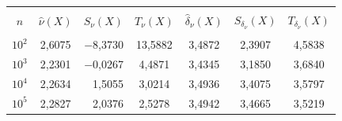 \begin{table}\small %


\begin{center}




\vspace*{2ex}





\tabcolsep=11.5pt


\begin{tabular}{|c|c|r|c|c|c|c|}


\hline


&&&&&&\\[-9pt]


$n$& ${\hat \nu}(X)$& \multicolumn{1}{c|}{$S_\nu(X)$}& $T_\nu(X)$& ${\hat \delta}_\nu(X)$& 


$S_{\delta_\nu}(X)$& $T_{\delta_\nu}(X)$\\[2pt]


\hline


&&&&&&\\[-9pt]


 $10^2$& 2{,}6075& $-$8{,}3730& 13{,}5882& 3{,}4872& 2{,}3907& 4{,}5838\\


 $10^3$& 2{,}2301& $-$0{,}0267& 4{,}4871& 3{,}4345& 3{,}1850& 3{,}6840\\


 $10^4$& 2{,}2634& 1{,}5055& 3{,}0214& 3{,}4936& 3{,}4075& 3{,}5797\\


 $10^5$& 2{,}2827& 2{,}0376& 2{,}5278& 3{,}4942& 3{,}4665& 3{,}5219\\


\hline


\end{tabular}


\end{center}


\end{table}











